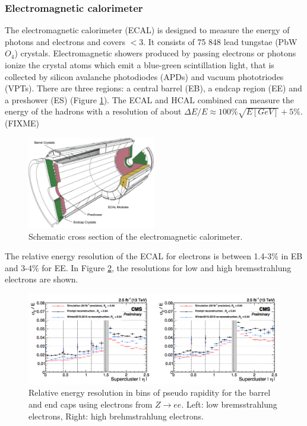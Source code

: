 {\subsubsection{Electromagnetic calorimeter}
The electromagnetic calorimeter (ECAL) is designed to measure the energy of photons and electrons and covers \abspsrap $<3$. It consists of 75 848 lead tungstae (PbW$O_4$) crystals. Electromagnetic showers produced by passing electrons or photons ionize the crystal atoms which emit a blue-green scintillation light, that is collected by silicon avalanche photodiodes (APDs) and vacuum phototriodes (VPTs). There are three regions: a central barrel (EB), a endcap region (EE) and a preshower (ES) (Figure \ref{fig:ECAL}). 
The ECAL and HCAL combined can measure the energy of the hadrons with a resolution of about $\Delta E/E \approx 100\% \sqrt{E[GeV]} + 5\%$. (FIXME)

\begin{figure}[ht]
	\centering
	\includegraphics[width=0.5\textwidth]{2_ExperimentalSetup/Figures/imageedit_5_8264930617}
	\caption{Schematic cross section of the electromagnetic calorimeter\cite{Chatrchyan:2008aa}.}
	\label{fig:ECAL}
\end{figure}
The relative energy resolution of the ECAL for electrons is between 1.4-3\% in EB and 3-4\% for EE. In Figure \ref{fig:ECALres}, the resolutions for low and high bremsstrahlung electrons are shown. 
\begin{figure}[ht]
	\centering
	\includegraphics[width=\textwidth]{2_ExperimentalSetup/Figures/imageedit_7_5931623976}
	\caption{Relative energy resolution in bins of pseudo rapidity for the barrel and end caps using electrons from $Z \rightarrow ee$. Left: low bremsstrahlung electrons, Right: high brehmstrahlung electrons\cite{Sun:2233637}.}
	\label{fig:ECALres}
\end{figure}


}
